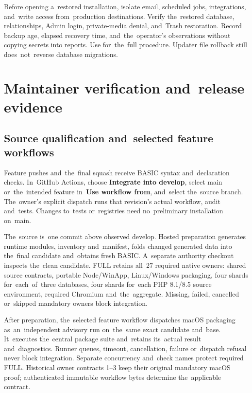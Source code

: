 \documentclass[11pt,a4paper]{article}
\newcommand{\filepath}[1]{\path{#1}}
\newcommand{\ui}[1]{\textbf{#1}}
\begin{document}
Before opening a~restored installation, isolate email, scheduled jobs,
integrations, and~write access from~production destinations. Verify the~restored
database, relationships, Admin login, private-media denial, and~Trash
restoration.
Record backup age, elapsed recovery time, and~the~operator's observations
without
copying secrets into reports. Use \filepath{docs/RECOVERY_OFF_HOST.md}
for~the~full
procedure. Updater file rollback still does~not~reverse database migrations.

\section{Maintainer verification and~release evidence}
\label{sec:release-evidence}

\subsection{Source qualification and~selected feature workflows}

Feature pushes and~the~final squash receive BASIC syntax and~declaration checks.
In~GitHub Actions, choose \ui{Integrate into develop}, select main
or~the~intended
feature in~\ui{Use workflow from}, and~select the~source branch. The~owner's
explicit dispatch runs that revision's actual workflow, audit and~tests.
Changes to~tests or~registries need no~preliminary installation on~main.

The~source is~one commit above observed develop. Hosted preparation generates
runtime modules, inventory and~manifest, folds changed generated data into
the~final candidate and~obtains fresh BASIC. A~separate authority checkout
inspects the~clean candidate. FULL retains all~27 required native owners:
shared source contracts, portable Node/WinApp, Linux/Windows packaging,
four shards for~each~of~three databases, four shards for~each PHP
8.1/8.5 source environment, required Chromium and~the~aggregate.
Missing, failed, cancelled or~skipped mandatory owners block integration.

After preparation, the~selected feature workflow dispatches macOS packaging
as~an~independent advisory run on~the~same exact candidate and~base. It~executes
the~central package suite and~retains its~actual result and~diagnostics.
Runner queues, timeout, cancellation, failure or~dispatch refusal never block
integration. Separate concurrency and~check names protect required FULL.
Historical owner contracts 1--3 keep their original mandatory macOS proof;
authenticated immutable workflow bytes determine the~applicable contract.
\end{document}
